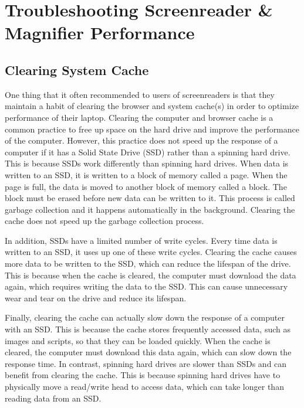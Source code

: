 \hypertarget{troubleshooting}{}\chapter[\hfill\break\raggedright Troubleshooting Screenreader \& Magnifier Performance]{Troubleshooting Screenreader \& Magnifier Performance}\label{troubleshooting}
{\let\clearpage\relax\localtableofcontents\let\clearpage\relax\locallistoftables}\newpage
\hypertarget{cache}{}\section{Clearing System Cache}\label{cache}
One thing that it often recommended to users of screenreaders is that they maintain a habit of clearing the browser and system cache(s) in order to optimize performance of their laptop. Clearing the computer and browser cache is a common practice to free up space on the hard drive and improve the performance of the computer. However, this practice does not speed up the response of a computer if it has a Solid State Drive (SSD) rather than a spinning hard drive. This is because SSDs work differently than spinning hard drives. When data is written to an SSD, it is written to a block of memory called a page. When the page is full, the data is moved to another block of memory called a block. The block must be erased before new data can be written to it. This process is called garbage collection and it happens automatically in the background. Clearing the cache does not speed up the garbage collection process.

In addition, SSDs have a limited number of write cycles. Every time data is written to an SSD, it uses up one of these write cycles. Clearing the cache causes more data to be written to the SSD, which can reduce the lifespan of the drive. This is because when the cache is cleared, the computer must download the data again, which requires writing the data to the SSD. This can cause unnecessary wear and tear on the drive and reduce its lifespan.

Finally, clearing the cache can actually slow down the response of a computer with an SSD. This is because the cache stores frequently accessed data, such as images and scripts, so that they can be loaded quickly. When the cache is cleared, the computer must download this data again, which can slow down the response time. In contrast, spinning hard drives are slower than SSDs and can benefit from clearing the cache. This is because spinning hard drives have to physically move a read/write head to access data, which can take longer than reading data from an SSD.

